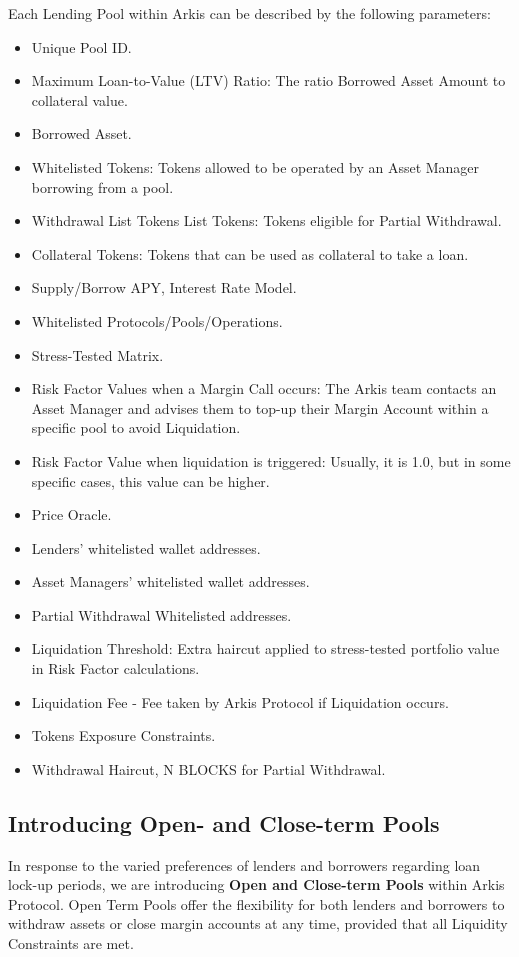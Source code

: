 \documentclass[conference]{IEEEtran}
\begin{document}
Each Lending Pool within Arkis can be described by the following parameters:
\begin{itemize}
	\item Unique Pool ID.
	\item Maximum Loan-to-Value (LTV) Ratio: The ratio Borrowed Asset Amount to collateral value.
	\item Borrowed Asset.
	\item Whitelisted Tokens: Tokens allowed to be operated by an Asset Manager borrowing from a pool.
	\item Withdrawal List Tokens List Tokens: Tokens eligible for Partial Withdrawal.
	\item Collateral Tokens: Tokens that can be used as collateral to take a loan.
	\item Supply/Borrow APY, Interest Rate Model.
	\item Whitelisted Protocols/Pools/Operations.
	\item Stress-Tested Matrix.
	\item Risk Factor Values when a Margin Call occurs: The Arkis team contacts an Asset Manager and advises them to top-up their Margin Account within a specific pool to avoid Liquidation.
	\item Risk Factor Value when liquidation is triggered: Usually, it is 1.0, but in some specific cases, this value can be higher.
	\item Price Oracle.
	\item Lenders’ whitelisted wallet addresses.
	\item Asset Managers’ whitelisted wallet addresses.
	\item Partial Withdrawal Whitelisted addresses.
	\item Liquidation Threshold: Extra haircut applied to stress-tested portfolio value in Risk Factor calculations.
	\item Liquidation Fee - Fee taken by Arkis Protocol if Liquidation occurs.
	\item Tokens Exposure Constraints.
	\item Withdrawal Haircut, N BLOCKS for Partial Withdrawal.
\end{itemize}


\subsection{Introducing Open- and Close-term Pools}
In response to the varied preferences of lenders and borrowers regarding loan lock-up periods, we are introducing \textbf{Open and Close-term Pools} within Arkis Protocol. Open Term Pools offer the flexibility for both lenders and borrowers to withdraw assets or close margin accounts at any time, provided that all Liquidity Constraints are met.
\end{document}
